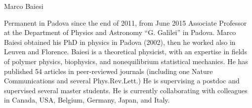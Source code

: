 \begin{participant}[type=leadPI,PM=12,gender=male]{Marco Baiesi}

  Permanent in Padova since the end of 2011, from June 2015 Associate Professor at the Department of Physics and Astronomy ``G. Galilei'' in Padova.
Marco Baiesi obtained his PhD in physics in Padova (2002), then he worked also in Leuven and Florence. Baiesi is a theoretical physicist, with an expertise in fields of polymer physics, biophysics, and nonequilibrium statistical mechanics.
 He has published 54 articles in peer-reviewed journals (including one Nature Communications and several Phys.Rev.Lett.)
He is supervising a postdoc and supervised several master students.
He is currently collaborating with colleagues in Canada, USA, Belgium, Germany, Japan, and Italy.

\end{participant}

